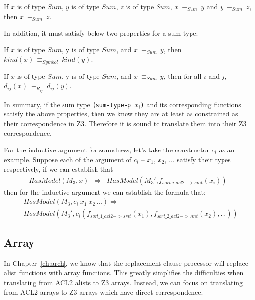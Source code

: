 \begin{property}
  If $x$ is of type $Sum$, $y$ is of type $Sum$, $z$ is of type $Sum$,
  $x\: \equiv_{Sum}\: y$ and $y\: \equiv_{Sum}\: z$, then $x\: \equiv_{Sum}\: z$.
\end{property}

\noindent In addition, it must satisfy below two properties for a sum type:

\begin{property}
  If $x$ is of type $Sum$, y is of type $Sum$, and $x\: \equiv_{Sum}\: y$, then
  $kind(x)\: \equiv_{Symbol}\: kind(y)$.
\end{property}

\begin{property}
  If $x$ is of type $Sum$, y is of type $Sum$, and $x\: \equiv_{Sum}\: y$,
  then for all $i$ and $j$, $d_{ij}(x)\: \equiv_{R_{ij}}\: d_{ij}(y)$.
\end{property}

In summary, if the sum type \texttt{(sum-type-p $x_i$)} and its corresponding
functions satisfy the above properties, then we know they are at least as
constrained as their correspondence in Z3. Therefore it is sound to translate
them into their Z3 correspondence.

For the inductive argument for soundness, let's take the constructor $c_i$ as an
example. Suppose each of the argument of $c_i$ -- $x_1$, $x_2$, $\ldots$ satisfy
their types respectively, if we can establish that
\begin{equation}\label{eq:datatypeconsbase}\begin{array}{rcl}
HasModel(M_3, x) &\Rightarrow& HasModel(M_3', f_{sort\_i\_acl2->smt}(x_i))
\end{array}\end{equation}
then for the inductive argument we can establish the formula that:
\begin{equation}\label{eq:datatypeconsinductive}\begin{array}{rcl}
&HasModel(M_3, c_i\ x_1\ x_2\ \ldots) \Rightarrow \\
&HasModel(M_3', c_i(f_{sort\_1\_acl2->smt}(x_1), f_{sort\_2\_acl2->smt}(x_2), \ldots))
\end{array}\end{equation}

\subsection{Array}\label{subsec:soundalisttype}
In Chapter~\ref{ch:arch}, we know that the replacement clause-processor will
replace alist functions with array functions. This greatly simplifies the
difficulties when translating from ACL2 alists to Z3 arrays. Instead, we can
focus on translating from ACL2 arrays to Z3 arrays which have direct
correspondence.

